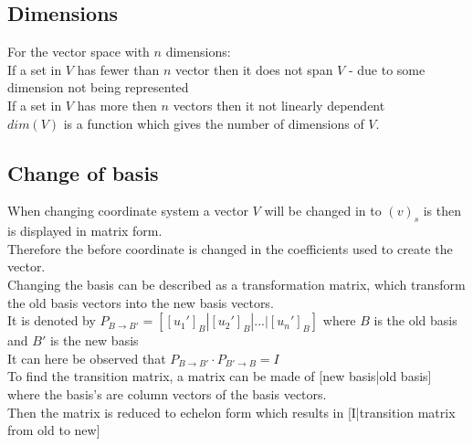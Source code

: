 \documentclass[12pt, a4paper]{article}
\begin{document}
		\subsection{Dimensions}
			For the vector space with $n$ dimensions:\\
			If a set in $V$ has fewer than $n$ vector then it does not span $V$ - due to some dimension not being represented\\
			If a set in $V$ has more then $n$ vectors then it not linearly dependent \\
			$dim(V)$ is a function which gives the number of dimensions of $V$.\\
		\subsection{Change of basis}
			When changing coordinate system a vector $V$ will be changed in to $(v)_s$ is then is displayed in matrix form.\\
			Therefore the before coordinate is changed in the coefficients used to create the vector.\\
			Changing the basis can be described as a transformation matrix, which transform the old basis vectors into the new basis vectors.\\
			It is denoted by $P_{B\rightarrow B'}=[[u_1']_B|[u_2']_B|...|[u_n']_B]$ where $B$ is the old basis and $B'$ is the new basis\\
			It can here be observed that $P_{B\rightarrow B'}\cdot P_{B'\rightarrow B}=I$\\
			To find the transition matrix, a matrix can be made of [new basis|old basis] where the basis's are column vectors of the basis vectors.\\
			Then the matrix is reduced to echelon form which results in [I|transition matrix from old to new]
\end{document}
